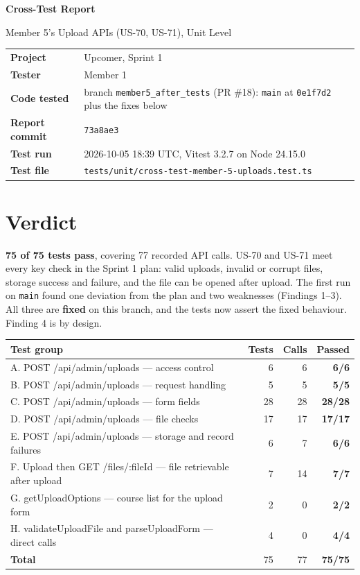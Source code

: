 \documentclass[10pt,a4paper]{article}
\begin{document}
{\color{brand}\Huge\bfseries Cross-Test Report\par}
\vspace{2pt}
{\Large Member 5's Upload APIs (US-70, US-71), Unit Level\par}
\vspace{8pt}
\begin{tabular}{@{}ll@{}}
\textbf{Project} & Upcomer, Sprint 1 \\
\textbf{Tester} & Member 1 \\
\textbf{Code tested} & branch \texttt{member5\_after\_tests} (PR \#18): \texttt{main} at \texttt{0e1f7d2} plus the fixes below \\
\textbf{Report commit} & \texttt{73a8ae3} \\
\textbf{Test run} & 2026-10-05 18:39 UTC, Vitest 3.2.7 on Node 24.15.0 \\
\textbf{Test file} & \texttt{tests/unit/cross-test-member-5-uploads.test.ts} \\
\end{tabular}

\section*{Verdict}
\textcolor{passgreen}{\textbf{75 of 75 tests pass}}, covering 77 recorded API calls. US-70 and US-71 meet every key check in the Sprint 1 plan: valid uploads, invalid or corrupt files, storage success and failure, and the file can be opened after upload. The first run on \texttt{main} found one deviation from the plan and two weaknesses (Findings 1--3). All three are \textcolor{passgreen}{\textbf{fixed}} on this branch, and the tests now assert the fixed behaviour. Finding 4 is by design.

\begin{longtable}{@{}P{7.5cm}rrr@{}}
\toprule \textbf{Test group} & \textbf{Tests} & \textbf{Calls} & \textbf{Passed} \\ \midrule
A. POST /api/admin/uploads — access control & 6 & 6 & \textcolor{passgreen}{\textbf{6/6}} \\
B. POST /api/admin/uploads — request handling & 5 & 5 & \textcolor{passgreen}{\textbf{5/5}} \\
C. POST /api/admin/uploads — form fields & 28 & 28 & \textcolor{passgreen}{\textbf{28/28}} \\
D. POST /api/admin/uploads — file checks & 17 & 17 & \textcolor{passgreen}{\textbf{17/17}} \\
E. POST /api/admin/uploads — storage and record failures & 6 & 7 & \textcolor{passgreen}{\textbf{6/6}} \\
F. Upload then GET /files/:fileId — file retrievable after upload & 7 & 14 & \textcolor{passgreen}{\textbf{7/7}} \\
G. getUploadOptions — course list for the upload form & 2 & 0 & \textcolor{passgreen}{\textbf{2/2}} \\
H. validateUploadFile and parseUploadForm — direct calls & 4 & 0 & \textcolor{passgreen}{\textbf{4/4}} \\
\midrule \textbf{Total} & 75 & 77 & \textcolor{passgreen}{\textbf{75/75}} \\
\bottomrule
\end{longtable}
\end{document}
